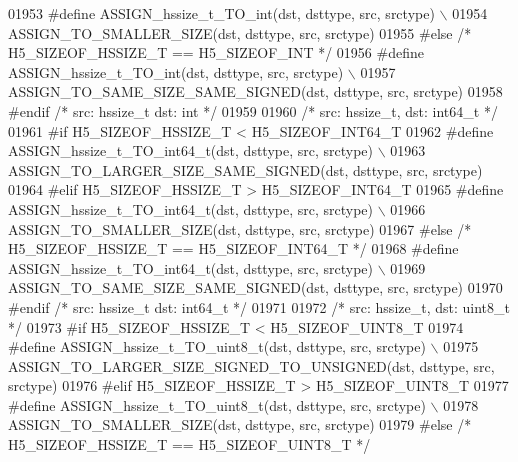 \begin{DoxyCode}
01953 \textcolor{preprocessor}{    #define ASSIGN\_hssize\_t\_TO\_int(dst, dsttype, src, srctype) \(\backslash\)}
01954 \textcolor{preprocessor}{        ASSIGN\_TO\_SMALLER\_SIZE(dst, dsttype, src, srctype)}
01955 \textcolor{preprocessor}{#else }\textcolor{comment}{/* H5\_SIZEOF\_HSSIZE\_T == H5\_SIZEOF\_INT */}\textcolor{preprocessor}{}
01956 \textcolor{preprocessor}{    #define ASSIGN\_hssize\_t\_TO\_int(dst, dsttype, src, srctype) \(\backslash\)}
01957 \textcolor{preprocessor}{        ASSIGN\_TO\_SAME\_SIZE\_SAME\_SIGNED(dst, dsttype, src, srctype)}
01958 \textcolor{preprocessor}{#endif }\textcolor{comment}{/* src: hssize\_t dst: int */}\textcolor{preprocessor}{}
01959 
01960 \textcolor{comment}{/* src: hssize\_t, dst: int64\_t */}
01961 \textcolor{preprocessor}{#if H5\_SIZEOF\_HSSIZE\_T < H5\_SIZEOF\_INT64\_T}
01962 \textcolor{preprocessor}{    #define ASSIGN\_hssize\_t\_TO\_int64\_t(dst, dsttype, src, srctype) \(\backslash\)}
01963 \textcolor{preprocessor}{        ASSIGN\_TO\_LARGER\_SIZE\_SAME\_SIGNED(dst, dsttype, src, srctype)}
01964 \textcolor{preprocessor}{#elif H5\_SIZEOF\_HSSIZE\_T > H5\_SIZEOF\_INT64\_T}
01965 \textcolor{preprocessor}{    #define ASSIGN\_hssize\_t\_TO\_int64\_t(dst, dsttype, src, srctype) \(\backslash\)}
01966 \textcolor{preprocessor}{        ASSIGN\_TO\_SMALLER\_SIZE(dst, dsttype, src, srctype)}
01967 \textcolor{preprocessor}{#else }\textcolor{comment}{/* H5\_SIZEOF\_HSSIZE\_T == H5\_SIZEOF\_INT64\_T */}\textcolor{preprocessor}{}
01968 \textcolor{preprocessor}{    #define ASSIGN\_hssize\_t\_TO\_int64\_t(dst, dsttype, src, srctype) \(\backslash\)}
01969 \textcolor{preprocessor}{        ASSIGN\_TO\_SAME\_SIZE\_SAME\_SIGNED(dst, dsttype, src, srctype)}
01970 \textcolor{preprocessor}{#endif }\textcolor{comment}{/* src: hssize\_t dst: int64\_t */}\textcolor{preprocessor}{}
01971 
01972 \textcolor{comment}{/* src: hssize\_t, dst: uint8\_t */}
01973 \textcolor{preprocessor}{#if H5\_SIZEOF\_HSSIZE\_T < H5\_SIZEOF\_UINT8\_T}
01974 \textcolor{preprocessor}{    #define ASSIGN\_hssize\_t\_TO\_uint8\_t(dst, dsttype, src, srctype) \(\backslash\)}
01975 \textcolor{preprocessor}{        ASSIGN\_TO\_LARGER\_SIZE\_SIGNED\_TO\_UNSIGNED(dst, dsttype, src, srctype)}
01976 \textcolor{preprocessor}{#elif H5\_SIZEOF\_HSSIZE\_T > H5\_SIZEOF\_UINT8\_T}
01977 \textcolor{preprocessor}{    #define ASSIGN\_hssize\_t\_TO\_uint8\_t(dst, dsttype, src, srctype) \(\backslash\)}
01978 \textcolor{preprocessor}{        ASSIGN\_TO\_SMALLER\_SIZE(dst, dsttype, src, srctype)}
01979 \textcolor{preprocessor}{#else }\textcolor{comment}{/* H5\_SIZEOF\_HSSIZE\_T == H5\_SIZEOF\_UINT8\_T */}\textcolor{preprocessor}{}

\end{DoxyCode}
